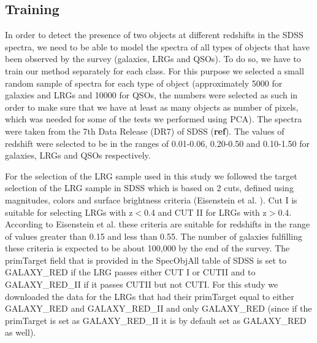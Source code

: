 \documentclass[apj]{emulateapj}
\begin{document}
\subsection{Training}\label{training}
In order to detect the presence of two objects at different redshifts in the SDSS spectra, we need to be able to model the spectra of all types of objects that have been observed by the survey (galaxies, LRGs and QSOs). To do so, we have to train our method separately for each class. For this purpose we selected a small random sample of spectra for each type of object (approximately 5000 for galaxies and LRGs and 10000 for QSOs, the numbers were selected as such in order to make sure that we have at least as many objects as number of pixels, which was needed for some of the tests we performed using PCA). The spectra were taken from the 7th Data Release (DR7) of SDSS (\textbf{ref}). The values of redshift were selected to be in the ranges of  0.01-0.06, 0.20-0.50 and 0.10-1.50 for galaxies, LRGs and QSOs respectively.

For the selection of the LRG sample used in this study we followed the target selection of the LRG sample in SDSS which is based on 2 cuts, defined using magnitudes, colors and surface brightness criteria (Eisenstein et al. \citealt{eisenstein}). Cut I is suitable for selecting LRGs with z$<$0.4 and CUT II for LRGs with z$>$0.4. According to Eisenstein et al. \cite{eisenstein} these criteria are suitable for redshifts in the range of values greater than 0.15 and less than 0.55. The number of galaxies fulfilling these criteria is expected to be about 100,000 by the end of the survey. The primTarget field that is provided in the SpecObjAll table of SDSS is set to GALAXY\_RED if the LRG passes either CUT I or CUTII and to GALAXY\_RED\_II if it passes CUTII but not CUTI. For this study we downloaded the data for the LRGs that had their primTarget equal to either GALAXY\_RED and GALAXY\_RED\_II and only GALAXY\_RED (since if the primTarget is set as GALAXY\_RED\_II it is by default set as GALAXY\_RED as well).
\end{document}
